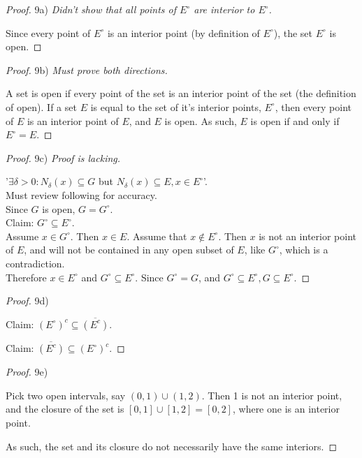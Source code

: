 \documentclass[10pt]{article}
\theoremstyle{definition}
\theoremstyle{plain}
\begin{document}
\begin{proof}
9a) \textit{Didn't show that all points of $E^\circ$ are interior to $E^\circ$.}

Since every point of $E^\circ$ is an interior point (by definition of $E^\circ$), the set $E^\circ$ is open.
\end{proof}

\begin{proof}
9b) \textit{Must prove both directions.}

A set is open if every point of the set is an interior point of the set (the definition of open). If a set $E$ is equal to the set of it's interior points, $E^\circ$, then every point of $E$ is an interior point of $E$, and $E$ is open. As such, $E$ is open if and only if $E^\circ = E$.
\end{proof}

\begin{proof}
9c) \textit{Proof is lacking.}

'$\exists\delta > 0: N_\delta (x) \subseteq G$ but $N_\delta (x) \subseteq E, x\in E^\circ$'. \\

Must review following for accuracy. \\

Since $G$ is open, $G=G^\circ$. \\

Claim: $G^\circ \subseteq E^\circ$. \\

Assume $x\in G^\circ$. Then $x\in E$.
Assume that $x\not\in E^\circ.$ Then $x$ is not an interior point of $E$, and will not be contained in any open subset of $E$, like $G^\circ$, which is a contradiction. \\

Therefore $x\in E^\circ$ and $G^\circ \subseteq E^\circ$. Since $G^\circ = G$, and $G^\circ \subseteq E^\circ, G\subseteq E^\circ$.
\end{proof}

\begin{proof}
9d)

Claim: $(E^\circ)^c \subseteq \overline{(E^c)}$.

Claim: $\overline{(E^c)} \subseteq (E^\circ)^c$.
\end{proof}

\begin{proof}
9e)

Pick two open intervals, say $(0,1)\cup(1,2)$. Then 1 is not an interior point, and the closure of the set is $[0,1]\cup[1,2] = [0,2]$, where one is an interior point.

As such, the set and its closure do not necessarily have the same interiors.
\end{proof}
\end{document}

